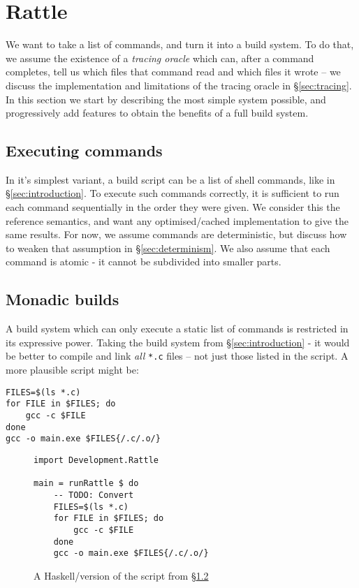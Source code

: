 \section{Rattle}
\label{sec:rattle}

We want to take a list of commands, and turn it into a build system. To do that, we assume the existence of a \emph{tracing oracle} which can, after a command completes, tell us which files that command read and which files it wrote -- we discuss the implementation and limitations of the tracing oracle in \S\ref{sec:tracing}. In this section we start by describing the most simple system possible, and progressively add features to obtain the benefits of a full build system.

\subsection{Executing commands}

In it's simplest variant, a build script can be a list of shell commands, like in \S\ref{sec:introduction}. To execute such commands correctly, it is sufficient to run each command sequentially in the order they were given. We consider this the reference semantics, and want any optimised/cached implementation to give the same results. For now, we assume commands are deterministic, but discuss how to weaken that assumption in \S\ref{sec:determinism}. We also assume that each command is atomic - it cannot be subdivided into smaller parts.

\subsection{Monadic builds}
\label{sec:monadic}

A build system which can only execute a static list of commands is restricted in its expressive power. Taking the build system from \S\ref{sec:introduction} - it would be better to compile and link \emph{all} \texttt{*.c} files -- not just those listed in the script. A more plausible script might be:

\begin{verbatim}
FILES=$(ls *.c)
for FILE in $FILES; do
    gcc -c $FILE
done
gcc -o main.exe $FILES{/.c/.o/}
\end{verbatim}

\begin{figure}
\begin{verbatim}
import Development.Rattle

main = runRattle $ do
    -- TODO: Convert
    FILES=$(ls *.c)
    for FILE in $FILES; do
        gcc -c $FILE
    done
    gcc -o main.exe $FILES{/.c/.o/}
\end{verbatim}
\caption{A Haskell/\Rattle version of the script from \S\ref{sec:monadic}}
\label{fig:monadic}
\end{figure}

